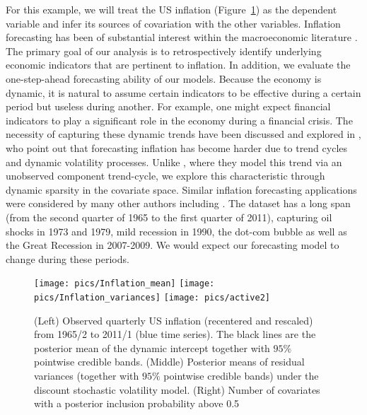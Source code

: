 \documentclass[ba]{imsart}
\numberwithin{equation}{section}
\theoremstyle{plain}
\begin{document}
{ {For this example, we will treat the US inflation (Figure~\ref{fig_inf}) as the dependent variable and infer its sources of covariation  with the other variables.
 Inflation forecasting has been of substantial interest within the macroeconomic literature \citep{stock1999forecasting,KoopKorobilis2012,groen,kalli_griffin,wright2009forecasting,stock2007has}. 
 The primary goal of our analysis is to retrospectively identify underlying economic indicators that are pertinent to inflation. In addition, we evaluate the one-step-ahead forecasting ability of our models.
Because the economy is dynamic, it is natural to assume certain indicators to be effective during a certain period but useless during another.
For example, one might expect financial indicators to play a significant role in the economy during a financial crisis.
 The necessity of capturing these dynamic trends have been discussed and explored in \cite{stock2007has}, who point out that forecasting inflation has become harder due to trend cycles and dynamic volatility processes.
Unlike \cite{stock2007has}, where they model this trend via an unobserved component trend-cycle, we explore this characteristic through dynamic sparsity in the covariate space. Similar inflation forecasting applications were considered by  many other authors including \cite{kalli_griffin,  KoopKorobilis2012}.
The dataset  has a long span (from  the second quarter of 1965 to the first quarter of 2011), capturing  oil shocks  in 1973 and 1979, mild recession in 1990, the dot-com bubble as well as  the Great Recession in  2007-2009.
We would expect our forecasting model to change during these periods.}




 \begin{figure}[t!]
\begin{center}
\texttt{[image: pics/Inflation\_mean]}
\texttt{[image: pics/Inflation\_variances]}
\texttt{[image: pics/active2]}
\end{center}
\caption{\small (Left) Observed quarterly US inflation (recentered and rescaled) from 1965/2 to 2011/1 (blue time series). The black lines are the posterior mean of the dynamic intercept together with $95\%$ pointwise credible bands.  
(Middle)  Posterior means of residual variances (together with $95\%$ pointwise credible bands) under the discount stochastic volatility model.  (Right) Number of covariates with a posterior inclusion probability above 0.5}\label{fig_inf}
\end{figure}

}
\end{document}
